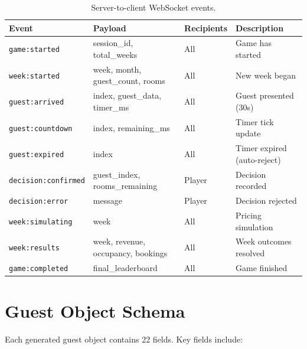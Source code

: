 \documentclass[12pt,a4paper,openany]{report}
\begin{document}
\begin{table}[H]
\centering
\caption{Server-to-client WebSocket events.}
\label{tab:s2cevents}
\small
\begin{tabular}{@{}llll@{}}
\toprule
\textbf{Event} & \textbf{Payload} & \textbf{Recipients} & \textbf{Description} \\
\midrule
\texttt{game:started}       & session\_id, total\_weeks           & All & Game has started \\
\texttt{week:started}       & week, month, guest\_count, rooms    & All & New week began \\
\texttt{guest:arrived}      & index, guest\_data, timer\_ms       & All & Guest presented (30s) \\
\texttt{guest:countdown}    & index, remaining\_ms                & All & Timer tick update \\
\texttt{guest:expired}      & index                               & All & Timer expired (auto-reject) \\
\texttt{decision:confirmed} & guest\_index, rooms\_remaining      & Player & Decision recorded \\
\texttt{decision:error}     & message                             & Player & Decision rejected \\
\texttt{week:simulating}    & week                                & All & Pricing simulation \\
\texttt{week:results}       & week, revenue, occupancy, bookings  & All & Week outcomes resolved \\
\texttt{game:completed}     & final\_leaderboard                  & All & Game finished \\
\bottomrule
\end{tabular}
\end{table}

\section{Guest Object Schema}

Each generated guest object contains 22 fields. Key fields include:
\end{document}
